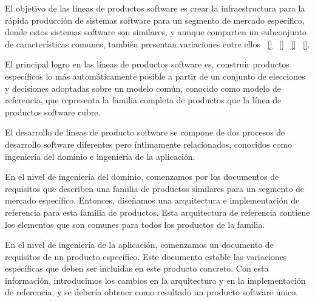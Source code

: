 El objetivo de las líneas de productos software es crear la infraestructura para la rápida  producción de sistemas software para un segmento de mercado específico, donde estos sistemas software son similares, y aunque comparten un subconjunto de características comunes, también presentan variaciones entre ellos ~\ref{} ~\ref{} ~\ref{} ~\ref{}.

El principal logro en las líneas de productos software es, construir productos específicos lo más automáticamente posible a partir de un conjunto de elecciones y decisiones adoptadas sobre un modelo común, conocido como modelo de referencia, que representa la familia completa de productos que la línea de productos software cubre.

El desarrollo de líneas de producto software se compone de dos procesos de desarrollo software diferentes pero íntimamente relacionados, conocidos como ingeniería del dominio e ingeniería de la aplicación.

En el nivel de ingeniería del dominio, comenzamos por los documentos de requisitos que describen una familia de productos similares para un segmento de mercado específico. Entonces, diseñamos una arquitectura e implementación de referencia para esta familia de productos. Esta arquitectura de referencia contiene los elementos que son comunes para todos los productos de la familia.

En el nivel de ingeniería de la aplicación, comenzamos un documento de requisitos de un producto específico. Este documento estable las variaciones específicas que deben ser incluidas en este producto concreto. Con esta información, introducimos los cambios en la arquitectura y en la implementación de referencia, y se debería obtener como resultado un producto software único.
